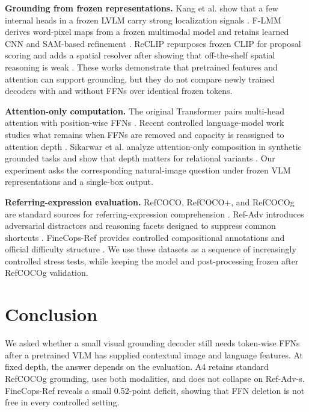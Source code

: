 \documentclass[10pt]{article}
\begin{document}
\textbf{Grounding from frozen representations.} Kang et al. show that a few
internal heads in a frozen LVLM carry strong localization signals
\citep{kang2025heads}. F-LMM derives word-pixel maps from a frozen multimodal
model and retains learned CNN and SAM-based refinement \citep{wu2025flmm}.
ReCLIP repurposes frozen CLIP for proposal scoring and adds a spatial resolver
after showing that off-the-shelf spatial reasoning is weak
\citep{subramanian2022reclip}. These works demonstrate that pretrained features
and attention can support grounding, but they do not compare newly trained
decoders with and without FFNs over identical frozen tokens.

\textbf{Attention-only computation.} The original Transformer pairs
multi-head attention with position-wise FFNs \citep{vaswani2017attention}.
Recent controlled language-model work studies what remains when FFNs are
removed and capacity is reassigned to attention depth
\citep{ndubuaku2026attention}. Sikarwar et al. analyze attention-only
composition in synthetic grounded tasks and show that depth matters for
relational variants \citep{sikarwar2022groundcompose}. Our experiment asks the
corresponding natural-image question under frozen VLM representations and a
single-box output.

\textbf{Referring-expression evaluation.} RefCOCO, RefCOCO+, and RefCOCOg are
standard sources for referring-expression comprehension
\citep{yu2016context}. Ref-Adv introduces adversarial distractors and reasoning
facets designed to suppress common shortcuts \citep{dong2026refadv}.
FineCops-Ref provides controlled compositional annotations and official
difficulty structure \citep{liu2024finecops}. We use these datasets as a
sequence of increasingly controlled stress tests, while keeping the model and
post-processing frozen after RefCOCOg validation.

\section{Conclusion}\label{conclusion}

We asked whether a small visual grounding decoder still needs token-wise FFNs
after a pretrained VLM has supplied contextual image and language features. At
fixed depth, the answer depends on the evaluation. A4 retains standard
RefCOCOg grounding, uses both modalities, and does not collapse on Ref-Adv-s.
FineCops-Ref reveals a small 0.52-point deficit, showing that FFN deletion is not
free in every controlled setting.
\end{document}

